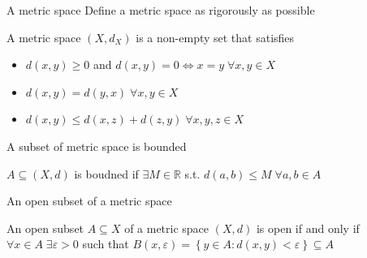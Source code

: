 \documentclass[a4paper,norsk]{article}
\renewcommand{\geq}{\geqslant}
\renewcommand{\leq}{\leqslant}
\renewcommand{\epsilon}{\varepsilon}
\begin{document}
\begin{oppgavebox}{A metric space}{}
Define a metric space as rigorously as possible
\begin{proofbox}{}{}
  A metric space $ \left( X, d_X \right)  $ is a non-empty set that satisfies
  \begin{itemize}
    \item $ d \left( x, y \right) \geq 0  $ and $ d \left( x, y \right) = 0 \iff x =y \; \forall x, y \in X $
    \item $ d \left( x,y \right) = d \left( y, x \right) \; \forall x, y \in X $
    \item $ d \left( x, y \right) \leq d \left( x, z \right) + d \left( z, y \right) \; \forall x, y, z \in X  $   
  \end{itemize}
\end{proofbox}
\end{oppgavebox}

\begin{oppgavebox}{A subset of metric space is bounded}{}
\begin{proofbox}{}{}
  $ A \subseteq \left( X, d \right)  $ is boudned if $ \exists M \in \mathbb{R} $ s.t. $ d \left( a, b \right) \leq M \; \forall a, b \in A $  
\end{proofbox}
\end{oppgavebox}

\begin{oppgavebox}{An open subset of a metric space}{}
\begin{proofbox}{}{}
  An open subset $ A \subseteq X $ of a metric space $ \left( X, d \right)  $ is open if and only if $ \forall x \in A \; \exists \epsilon > 0 $ such that $ B \left( x, \epsilon \right) = \left\{ y \in A : d \left( x, y \right) < \epsilon  \right\} \subseteq A  $ 
\end{proofbox}
\end{oppgavebox}
\end{document}
